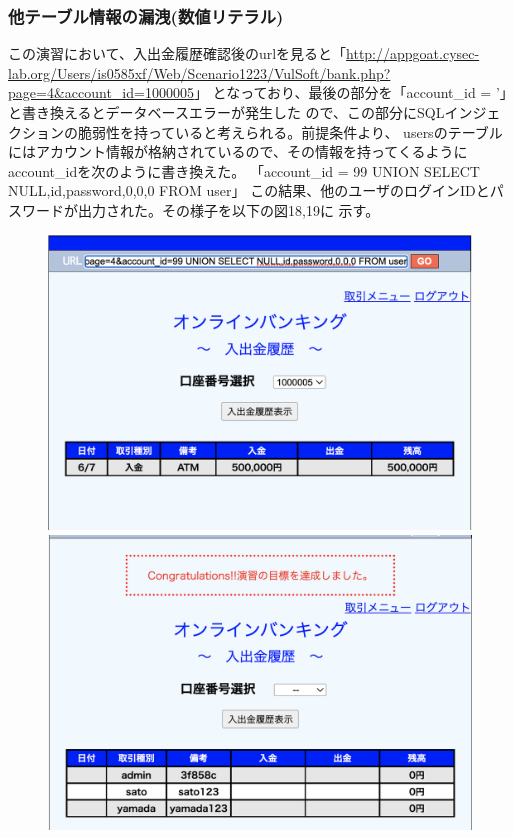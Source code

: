 \documentclass[dvipdfmx,autodetect-engine,titlepage]{jsarticle}
\begin{document}
\subsubsection*{他テーブル情報の漏洩(数値リテラル)}
この演習において、入出金履歴確認後のurlを見ると「\url{http://appgoat.cysec-lab.org/Users/is0585xf/Web/Scenario1223/VulSoft/bank.php?page=4&account_id=1000005}」
となっており、最後の部分を「account\_id = '」と書き換えるとデータベースエラーが発生した
ので、この部分にSQLインジェクションの脆弱性を持っていると考えられる。前提条件より、
usersのテーブルにはアカウント情報が格納されているので、その情報を持ってくるように
account\_idを次のように書き換えた。
「account\_id = 99 UNION SELECT NULL,id,password,0,0,0 FROM user」
この結果、他のユーザのログインIDとパスワードが出力された。その様子を以下の図18,19に
示す。

\begin{figure}[h]
  \centering
  \begin{minipage}[b]{0.45\linewidth}
  \begin{center}
    \includegraphics[keepaspectratio,scale=0.35]{pic18.png}
    \end{center}
    \caption{}
  \end{minipage}
  \begin{minipage}[b]{0.45\linewidth}
  \begin{center}
    \includegraphics[keepaspectratio,scale=0.35]{pic19.png}

\end{center}
\end{minipage}
\end{figure}
\end{document}
